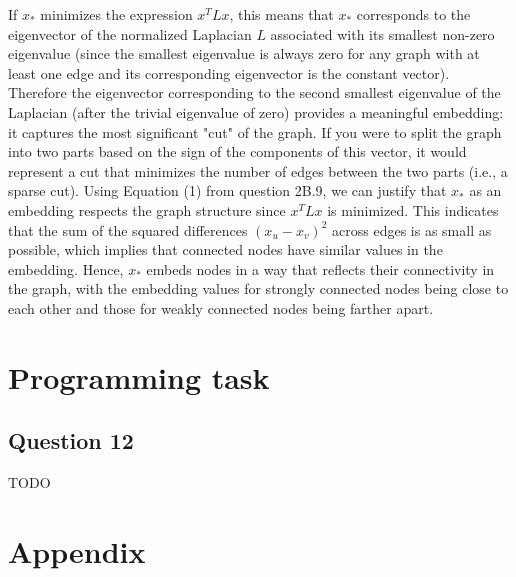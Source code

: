 \documentclass{article}
\begin{document}
If \( x_* \) minimizes the expression \( x^T L x \), this means that \( x_* \) corresponds to the eigenvector of the normalized Laplacian \( L \) associated with its smallest non-zero eigenvalue (since the smallest eigenvalue is always zero for any graph with at least one edge and its corresponding eigenvector is the constant vector).
Therefore the eigenvector corresponding to the second smallest eigenvalue of the Laplacian (after the trivial eigenvalue of zero) provides a meaningful embedding: it captures the most significant "cut" of the graph. If you were to split the graph into two parts based on the sign of the components of this vector, it would represent a cut that minimizes the number of edges between the two parts (i.e., a sparse cut).
Using Equation (1) from question 2B.9, we can justify that \( x_* \) as an embedding respects the graph structure since \( x^T L x \) is minimized. This indicates that the sum of the squared differences \( (x_u - x_v)^2 \) across edges is as small as possible, which implies that connected nodes have similar values in the embedding. Hence, \( x_* \) embeds nodes in a way that reflects their connectivity in the graph, with the embedding values for strongly connected nodes being close to each other and those for weakly connected nodes being farther apart.

\section{Programming task}

\subsection{Question 12}
TODO

\newpage
\appendix

\section{Appendix}
\end{document}
